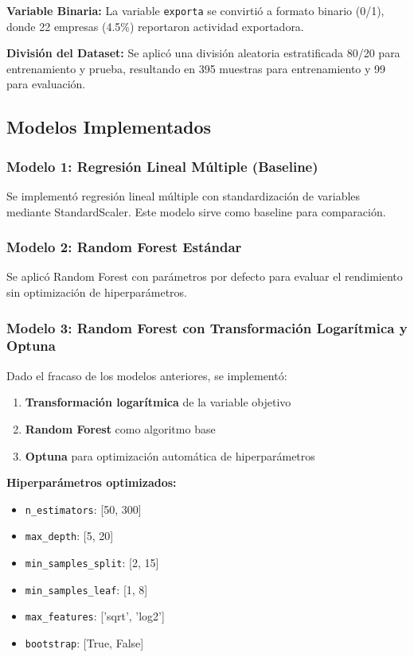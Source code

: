 \documentclass[12pt,a4paper]{article}
\begin{document}
\textbf{Variable Binaria:}
La variable \texttt{exporta} se convirtió a formato binario (0/1), donde 22 empresas (4.5\%) reportaron actividad exportadora.

\textbf{División del Dataset:}
Se aplicó una división aleatoria estratificada 80/20 para entrenamiento y prueba, resultando en 395 muestras para entrenamiento y 99 para evaluación.

\subsection{Modelos Implementados}

\subsubsection{Modelo 1: Regresión Lineal Múltiple (Baseline)}

Se implementó regresión lineal múltiple con standardización de variables mediante StandardScaler. Este modelo sirve como baseline para comparación.

\subsubsection{Modelo 2: Random Forest Estándar}

Se aplicó Random Forest con parámetros por defecto para evaluar el rendimiento sin optimización de hiperparámetros.

\subsubsection{Modelo 3: Random Forest con Transformación Logarítmica y Optuna}

Dado el fracaso de los modelos anteriores, se implementó:
\begin{enumerate}
    \item \textbf{Transformación logarítmica} de la variable objetivo
    \item \textbf{Random Forest} como algoritmo base
    \item \textbf{Optuna} para optimización automática de hiperparámetros
\end{enumerate}

\textbf{Hiperparámetros optimizados:}
\begin{itemize}
    \item \texttt{n\_estimators}: [50, 300]
    \item \texttt{max\_depth}: [5, 20]
    \item \texttt{min\_samples\_split}: [2, 15]
    \item \texttt{min\_samples\_leaf}: [1, 8]
    \item \texttt{max\_features}: ['sqrt', 'log2']
    \item \texttt{bootstrap}: [True, False]
\end{itemize}
\end{document}
